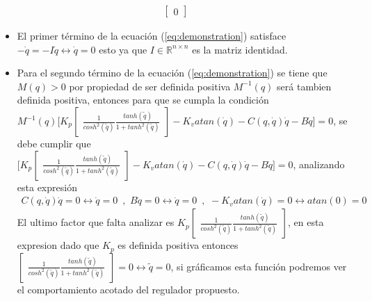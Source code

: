 \documentclass[12pt]{article}
\begin{document}
\begin{enumerate}
\begin{equation}
\begin{split}
\begin{bmatrix}
                0
            \end{bmatrix}
        \end{split}
        \label{eq:demonstration}
    \end{equation}
    \begin{itemize}
        \item El primer término de la ecuación (\ref{eq:demonstration}) satisface $-\dot{q}=-I\dot{q}\leftrightarrow \dot{q}=0$ esto ya que $I \in \mathbb{R}^{n\times n}$ es la matriz identidad.
        \item Para el segundo término de la ecuación (\ref{eq:demonstration}) se tiene que $M(q)>0$
        por propiedad de ser definida positiva $M^{-1}(q)$ será tambien definida positiva, entonces para que se cumpla la condición $M^{-1}(q)\lbrack K_p
        \begin{bmatrix}
            \frac{1}{cosh^2(\tilde{q})}\frac{tanh(\tilde{q})}{1+tanh^2(\tilde{q})}
        \end{bmatrix}
        -K_vatan(\dot{q})-C(q,\dot{q})\dot{q}-B\dot{q}\rbrack=0$, se debe cumplir que $\lbrack K_p
        \begin{bmatrix}
            \frac{1}{cosh^2(\tilde{q})}\frac{tanh(\tilde{q})}{1+tanh^2(\tilde{q})}
        \end{bmatrix}
        -K_vatan(\dot{q})-C(q,\dot{q})\dot{q}-B\dot{q}\rbrack=0$, analizando esta expresión
        \begin{equation}
            \begin{split}
                C(q,\dot{q})\dot{q}=0\leftrightarrow\dot{q}=0\enspace \text{,}\enspace 
                B\dot{q}=0\leftrightarrow\dot{q}=0\enspace \text{,}\enspace -K_vatan(\dot{q})=0\leftrightarrow atan(0)=0
            \end{split}
            \label{eq:conditions}
        \end{equation}
        El ultimo factor que falta analizar es $K_p
        \begin{bmatrix}
            \frac{1}{cosh^2(\tilde{q})}\frac{tanh(\tilde{q})}{1+tanh^2(\tilde{q})}
        \end{bmatrix}$, en esta expresion dado que $K_p$ es definida positiva entonces $\begin{bmatrix}
            \frac{1}{cosh^2(\tilde{q})}\frac{tanh(\tilde{q})}{1+tanh^2(\tilde{q})}
        \end{bmatrix}=0\leftrightarrow\tilde{q}=0$, si gráficamos esta función podremos ver el comportamiento acotado del regulador propuesto.


\end{itemize}
\end{enumerate}
\end{document}
